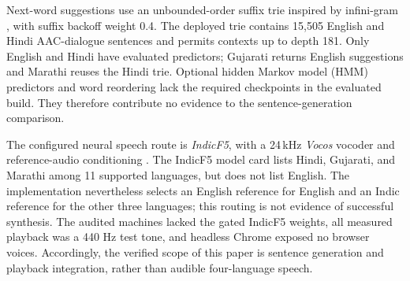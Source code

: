 Next-word suggestions use an unbounded-order suffix trie inspired by infini-gram \citep{liu2024infinigram}, with suffix backoff weight 0.4.
The deployed trie contains 15,505 English and Hindi AAC-dialogue sentences and permits contexts up to depth 181.
Only English and Hindi have evaluated predictors; Gujarati returns English suggestions and Marathi reuses the Hindi trie.
Optional hidden Markov model (HMM) predictors and word reordering lack the required checkpoints in the evaluated build.
They therefore contribute no evidence to the sentence-generation comparison.

The configured neural speech route is \emph{IndicF5}, with a 24\,kHz \emph{Vocos} vocoder and reference-audio conditioning \citep{ai4bharat2025indicf5,siuzdak2023vocos}.
The IndicF5 model card lists Hindi, Gujarati, and Marathi among 11 supported languages, but does not list English.
The implementation nevertheless selects an English reference for English and an Indic reference for the other three languages; this routing is not evidence of successful synthesis.
The audited machines lacked the gated IndicF5 weights, all measured playback was a 440 Hz test tone, and headless Chrome exposed no browser voices.
Accordingly, the verified scope of this paper is sentence generation and playback integration, rather than audible four-language speech.
